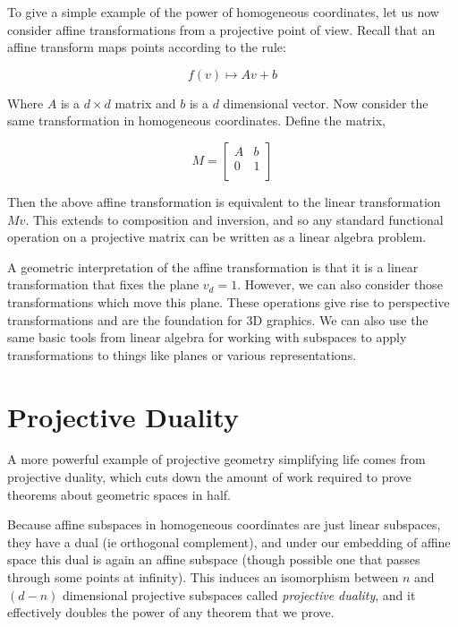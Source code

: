 \documentclass{article}[11pt]
\begin{document}
To give a simple example of the power of homogeneous coordinates, let us now consider affine transformations from a projective point of view.  Recall that an affine transform maps points according to the rule:

\[ f(v) \mapsto A v + b \]

Where $A$ is a $d \times d$ matrix and $b$ is a $d$ dimensional vector.  Now consider the same transformation in homogeneous coordinates.  Define the matrix,

\[ M = \left [ \begin{array}{cc}
A & b \\
0 & 1 \\
\end{array} \right ] \]

Then the above affine transformation is equivalent to the linear transformation $M v$.  This extends to composition and inversion, and so any standard functional operation on a projective matrix can be written as a linear algebra problem.

A geometric interpretation of the affine transformation is that it is a linear transformation that fixes the plane $v_d = 1$.  However, we can also consider those transformations which move this plane.  These operations give rise to perspective transformations and are the foundation for 3D graphics.  We can also use the same basic tools from linear algebra for working with subspaces to apply transformations to things like planes or various representations.

\section{Projective Duality}

A more powerful example of projective geometry simplifying life comes from projective duality, which cuts down the amount of work required to prove theorems about geometric spaces in half.

Because affine subspaces in homogeneous coordinates are just linear subspaces, they have a dual (ie orthogonal complement), and under our embedding of affine space this dual is again an affine subspace (though possible one that passes through some points at infinity).  This induces an isomorphism between $n$ and $(d-n)$ dimensional projective subspaces called \emph{projective duality}, and it effectively doubles the power of any theorem that we prove.
\end{document}
